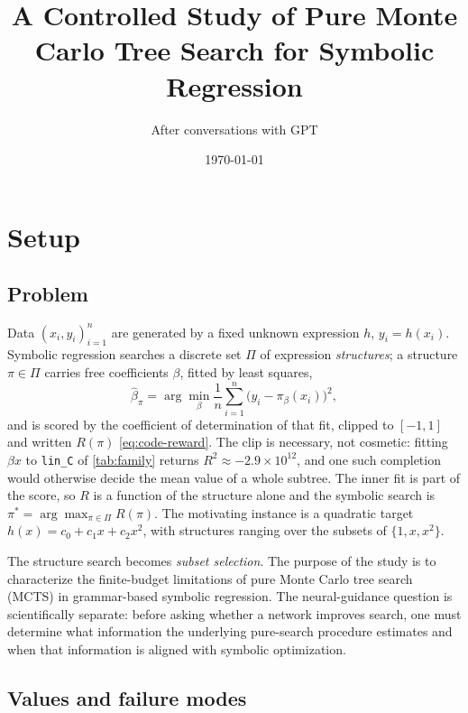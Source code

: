 \documentclass[11pt, a4paper]{article}
\title{A Controlled Study of Pure Monte Carlo Tree Search for Symbolic Regression}
\author{After conversations with GPT}
\date{\today}
\theoremstyle{definition}
\begin{document}
\maketitle
\setlength{\emergencystretch}{3em}  %

\section{Setup}
\label{sec:pure-mcts-study}

\subsection{Problem}

Data \((x_i,y_i)_{i=1}^n\) are generated by a fixed unknown expression \(h\),
\(y_i=h(x_i)\).  Symbolic regression searches a discrete set \(\Pi\) of
expression \emph{structures}; a structure \(\pi\in\Pi\) carries free
coefficients \(\beta\), fitted by least squares,
\[
    \hat\beta_\pi
    =
    \arg\min_\beta \frac1n\sum_{i=1}^n\bigl(y_i-\pi_\beta(x_i)\bigr)^2,
\]
and is scored by the coefficient of determination of that fit, clipped to
\([-1,1]\) and written \(R(\pi)\) \eqref{eq:code-reward}.  The clip is
necessary, not cosmetic: fitting \(\beta x\) to \texttt{lin\_C} of
\cref{tab:family} returns \(R^2\approx-2.9\times10^{12}\), and one such
completion would otherwise decide the mean value of a whole subtree.  The
inner fit is part of the score, so \(R\) is a function of the structure alone
and the symbolic search is \(\pi^*=\arg\max_{\pi\in\Pi}R(\pi)\).  The
motivating instance is a quadratic target \(h(x)=c_0+c_1x+c_2x^2\), with
structures ranging over the subsets of \(\{1,x,x^2\}\).

The structure search becomes \emph{subset selection}.  The purpose of the
study is to characterize the finite-budget limitations of pure Monte Carlo
tree search (MCTS) in grammar-based symbolic regression.  The
neural-guidance question is scientifically separate: before asking whether a
network improves search, one must determine what information the underlying
pure-search procedure estimates and when that information is aligned with
symbolic optimization.

\subsection{Values and failure modes}
\label{subsec:values-failure-modes}
\end{document}
